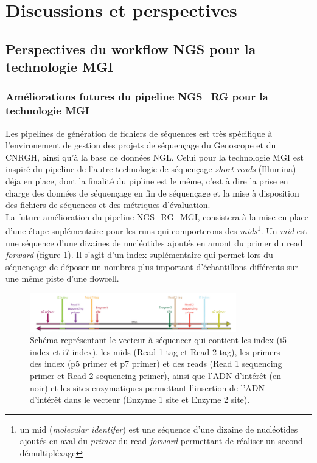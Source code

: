 \section{Discussions et perspectives}
\subsection{Perspectives du workflow NGS pour la technologie MGI}

\subsubsection{Améliorations futures du pipeline NGS\_RG pour la technologie MGI}
Les pipelines de génération de fichiers de séquences est très spécifique à l'environement de gestion des projets de séquençage du Genoscope et du CNRGH, ainsi qu'à la base de données NGL. Celui pour la technologie MGI est inspiré du pipeline de l'autre technologie de séquençage \emph{short reads} (Illumina) déja en place, dont la finalité du pipline est le même, c'est à dire la prise en charge des données de séquençage en fin de séquençage et la mise à disposition des fichiers de séquences et des métriques d'évaluation.\\

La future amélioration du pipeline NGS\_RG\_MGI, consistera à la mise en place d'une étape suplémentaire pour les runs qui comporterons des \emph{mids}\footnote{un mid (\emph{molecular identifer}) est une séquence d'une dizaine de nucléotides ajoutés en aval du \emph{primer} du read \emph{forward} permettant de réaliser un second démultipléxage}. 
Un \emph{mid} est une séquence d'une dizaines de nucléotides ajoutés en amont du primer du read \emph{forward} (figure \ref{schema-mid}). Il s'agit d'un index suplémentaire qui permet lors du séquençage de déposer un nombres plus important d'échantillons différents sur une même piste d'une flowcell. 

\begin{figure}[H]
    \centering
    \includegraphics[width=0.8\textwidth]{img/schema-reads-index-mids.png}
    \caption{\footnotesize{Schéma représentant le vecteur à séquencer qui contient les index (i5 index et i7 index), les mids (Read 1 tag et Read 2 tag), les primers des index (p5 primer et p7 primer) et des reads (Read 1 sequencing primer et Read 2 sequencing primer), ainsi que l'ADN d'intérêt (en noir) et les sites enzymatiques permettant l'insertion de l'ADN d'intérêt dans le vecteur (Enzyme 1 site et Enzyme 2 site).}}
    \label{schema-mid}
\end{figure}

